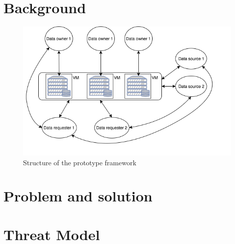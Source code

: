 \documentclass[conference]{IEEEtran}
\begin{document}
\section{Background}


\begin{figure}[t]
	\includegraphics[width=0.95\linewidth]{mid_sem_graphic.png}
	\caption{Structure of the prototype framework}
	\label{fig:framework}
\end{figure}

\section{Problem and solution}


\section{Threat Model}

\end{document}
